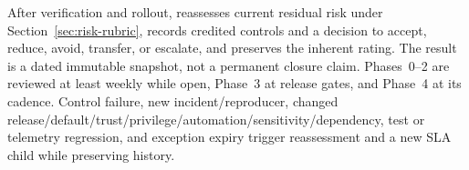 \documentclass[../main.tex]{subfiles}
\begin{document}
After verification and rollout,  reassesses current residual risk
under Section~\ref{sec:risk-rubric}, records credited controls and a decision to
accept, reduce, avoid, transfer, or escalate, and preserves the inherent rating.
The result is a dated immutable snapshot, not a permanent closure claim.
Phases~0--2 are reviewed at least weekly while open, Phase~3 at release gates,
and Phase~4 at its cadence. Control failure, new incident/reproducer, changed
release/default/trust/privilege/automation/sensitivity/dependency, test or
telemetry regression, and exception expiry trigger reassessment and a new SLA
child while preserving history.
\end{document}
